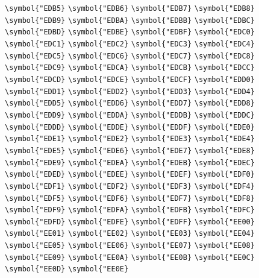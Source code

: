 \documentclass{ctexbook}
\begin{document}
{\verb|\symbol{"EDB5}|  \verb|\symbol{"EDB6}|  \verb|\symbol{"EDB7}|  \verb|\symbol{"EDB8}|  \verb|\symbol{"EDB9}|  \verb|\symbol{"EDBA}|  \verb|\symbol{"EDBB}|  \verb|\symbol{"EDBC}|  \verb|\symbol{"EDBD}|  \verb|\symbol{"EDBE}|  \verb|\symbol{"EDBF}|  \verb|\symbol{"EDC0}|  \verb|\symbol{"EDC1}|  \verb|\symbol{"EDC2}|  \verb|\symbol{"EDC3}|  \verb|\symbol{"EDC4}|  \verb|\symbol{"EDC5}|  \verb|\symbol{"EDC6}|  \verb|\symbol{"EDC7}|  \verb|\symbol{"EDC8}|  \verb|\symbol{"EDC9}|  \verb|\symbol{"EDCA}|  \verb|\symbol{"EDCB}|  \verb|\symbol{"EDCC}|  \verb|\symbol{"EDCD}|  \verb|\symbol{"EDCE}|  \verb|\symbol{"EDCF}|  \verb|\symbol{"EDD0}|  \verb|\symbol{"EDD1}|  \verb|\symbol{"EDD2}|  \verb|\symbol{"EDD3}|  \verb|\symbol{"EDD4}|  \verb|\symbol{"EDD5}|  \verb|\symbol{"EDD6}|  \verb|\symbol{"EDD7}|  \verb|\symbol{"EDD8}|  \verb|\symbol{"EDD9}|  \verb|\symbol{"EDDA}|  \verb|\symbol{"EDDB}|  \verb|\symbol{"EDDC}|  \verb|\symbol{"EDDD}|  \verb|\symbol{"EDDE}|  \verb|\symbol{"EDDF}|  \verb|\symbol{"EDE0}|  \verb|\symbol{"EDE1}|  \verb|\symbol{"EDE2}|  \verb|\symbol{"EDE3}|  \verb|\symbol{"EDE4}|  \verb|\symbol{"EDE5}|  \verb|\symbol{"EDE6}|  \verb|\symbol{"EDE7}|  \verb|\symbol{"EDE8}|  \verb|\symbol{"EDE9}|  \verb|\symbol{"EDEA}|  \verb|\symbol{"EDEB}|  \verb|\symbol{"EDEC}|  \verb|\symbol{"EDED}|  \verb|\symbol{"EDEE}|  \verb|\symbol{"EDEF}|  \verb|\symbol{"EDF0}|  \verb|\symbol{"EDF1}|  \verb|\symbol{"EDF2}|  \verb|\symbol{"EDF3}|  \verb|\symbol{"EDF4}|  \verb|\symbol{"EDF5}|  \verb|\symbol{"EDF6}|  \verb|\symbol{"EDF7}|  \verb|\symbol{"EDF8}|  \verb|\symbol{"EDF9}|  \verb|\symbol{"EDFA}|  \verb|\symbol{"EDFB}|  \verb|\symbol{"EDFC}|  \verb|\symbol{"EDFD}|  \verb|\symbol{"EDFE}|  \verb|\symbol{"EDFF}|  \verb|\symbol{"EE00}|  \verb|\symbol{"EE01}|  \verb|\symbol{"EE02}|  \verb|\symbol{"EE03}|  \verb|\symbol{"EE04}|  \verb|\symbol{"EE05}|  \verb|\symbol{"EE06}|  \verb|\symbol{"EE07}|  \verb|\symbol{"EE08}|  \verb|\symbol{"EE09}|  \verb|\symbol{"EE0A}|  \verb|\symbol{"EE0B}|  \verb|\symbol{"EE0C}|  \verb|\symbol{"EE0D}|  \verb|\symbol{"EE0E}|  }
\end{document}
